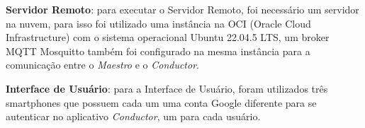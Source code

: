 \textbf{Servidor Remoto}: para executar o Servidor Remoto, foi necessário um servidor na nuvem, para isso foi utilizado uma instância na OCI
(Oracle Cloud Infrastructure) com o sistema operacional Ubuntu 22.04.5 LTS, um broker MQTT Mosquitto também foi configurado na mesma instância para 
a comunicação entre o \emph{Maestro} e o \emph{Conductor}.

\textbf{Interface de Usuário}: para a Interface de Usuário, foram utilizados três
smartphones que possuem cada um uma conta Google diferente para se autenticar no aplicativo \emph{Conductor}, um para cada usuário.





